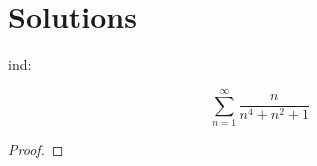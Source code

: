 \documentclass[10pt, oneside]{article}
\title{}
\author{Jack Ceroni}
\date{}
\newenvironment{problem}[2][Problem]{\begin{trivlist}
\item[\hskip \labelsep {\bfseries #1}\hskip \labelsep {\bfseries #2.}]}{\end{trivlist}}
\begin{document}
    \maketitle
    \tableofcontents

    \vspace{.25in}

    \section{Solutions}

    \begin{problem}
      Find:

      $$\displaystyle\sum_{n = 1}^{\infty} \frac{n}{n^4 + n^2 + 1}$$
    \end{problem}

    \begin{proof}

      \end{proof}

    
\end{document}
